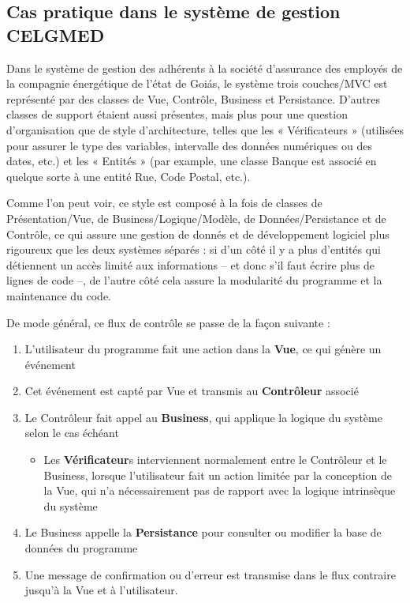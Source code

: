 \subsection{Cas pratique dans le système de gestion CELGMED}\label{section-flux}

Dans le système de gestion des adhérents à la société d'assurance des employés de la compagnie énergétique de l'état de Goiás, le système trois couches/MVC est représenté par des classes de Vue, Contrôle, Business et Persistance. D'autres classes de support étaient aussi présentes, mais plus pour une question d'organisation que de  style d'architecture, telles que les  « Vérificateurs » (utilisées pour assurer le type des variables, intervalle des données numériques ou des dates, etc.) et les « Entités » (par example, une classe Banque est associé en quelque sorte à une entité Rue, Code Postal, etc.). 

Comme l'on peut voir, ce style est composé à la fois de classes de Présentation/Vue, de Business/Logique/Modèle, de Données/Persistance et de Contrôle, ce qui assure une gestion de donnés et de développement logiciel plus rigoureux que les deux systèmes séparés : si d'un côté il y a plus d'entités qui détiennent un accès limité aux informations -- et donc s'il faut écrire plus de lignes de code --, de l'autre côté cela assure la modularité du programme et la maintenance du code.

De mode général, ce flux de contrôle se passe de la façon suivante :

\begin{enumerate}
\item L'utilisateur du programme fait une action dans la \textbf{Vue}, ce qui génère un événement
\item Cet événement est capté par Vue et transmis au \textbf{Contrôleur} associé
\item Le Contrôleur fait appel au \textbf{Business}, qui applique la logique du système selon le cas échéant
\begin{itemize}
\item Les \textbf{Vérificateur}s interviennent normalement entre le Contrôleur et le Business, lorsque l'utilisateur fait un action limitée par la conception de la Vue, qui n'a nécessairement pas de rapport avec la logique intrinsèque du système
\end{itemize}
\item Le Business appelle la \textbf{Persistance} pour consulter ou modifier la base de données du programme
\item Une message de confirmation ou d'erreur est transmise dans le flux contraire jusqu'à la Vue et à l'utilisateur.
\end{enumerate}

